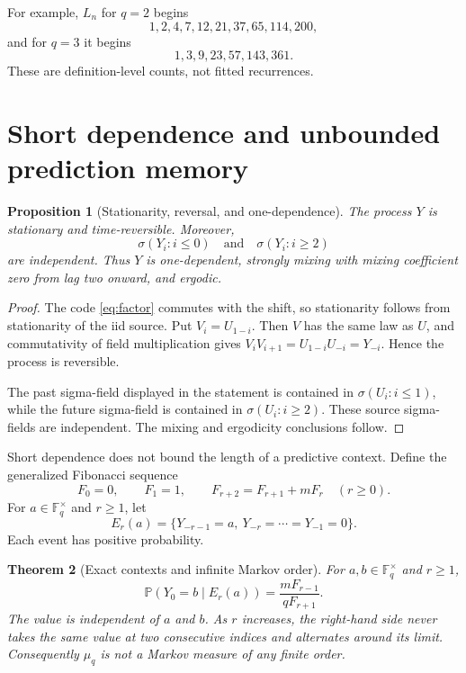 \documentclass[11pt,a4paper]{amsart}
\newtheorem{theorem}{Theorem}[section]
\newtheorem{proposition}[theorem]{Proposition}
\theoremstyle{definition}
\theoremstyle{remark}
\newcommand{\F}{\mathbb F}
\newcommand{\Prob}{\mathbb P}
\begin{document}
For example, $L_n$ for $q=2$ begins
\[
 1,2,4,7,12,21,37,65,114,200,
\]
and for $q=3$ it begins
\[
 1,3,9,23,57,143,361.
\]
These are definition-level counts, not fitted recurrences.

\section{Short dependence and unbounded prediction memory}
\label{sec:memory}

\begin{proposition}[Stationarity, reversal, and one-dependence]
\label{prop:mixing}
The process $Y$ is stationary and time-reversible.  Moreover,
\[
 \sigma(Y_i:i\leq0)
 \quad\text{and}\quad
 \sigma(Y_i:i\geq2)
\]
are independent.  Thus $Y$ is one-dependent, strongly mixing with mixing
coefficient zero from lag two onward, and ergodic.
\end{proposition}

\begin{proof}
The code \eqref{eq:factor} commutes with the shift, so stationarity follows
from stationarity of the iid source.  Put $V_i=U_{1-i}$.  Then $V$ has the
same law as $U$, and commutativity of field multiplication gives
$V_iV_{i+1}=U_{1-i}U_{-i}=Y_{-i}$.  Hence the process is reversible.

The past sigma-field displayed in the statement is contained in
$\sigma(U_i:i\leq1)$, while the future sigma-field is contained in
$\sigma(U_i:i\geq2)$.  These source sigma-fields are independent.  The
mixing and ergodicity conclusions follow.
\end{proof}

Short dependence does not bound the length of a predictive context.  Define
the generalized Fibonacci sequence
\begin{equation}\label{eq:F-recurrence}
 F_0=0,\qquad F_1=1,\qquad
 F_{r+2}=F_{r+1}+mF_r\quad(r\geq0).
\end{equation}
For $a\in\F_q^\times$ and $r\geq1$, let
\begin{equation}\label{eq:context-event}
 E_r(a)=\{Y_{-r-1}=a,\ Y_{-r}=\cdots=Y_{-1}=0\}.
\end{equation}
Each event has positive probability.

\begin{theorem}[Exact contexts and infinite Markov order]
\label{thm:infinite-memory}
For $a,b\in\F_q^\times$ and $r\geq1$,
\begin{equation}\label{eq:context-probability}
 \Prob(Y_0=b\mid E_r(a))
 =\frac{mF_{r-1}}{qF_{r+1}}.
\end{equation}
The value is independent of $a$ and $b$.  As $r$ increases, the right-hand
side never takes the same value at two consecutive indices and alternates
around its limit.  Consequently $\mu_q$ is not a Markov measure of any
finite order.
\end{theorem}
\end{document}
